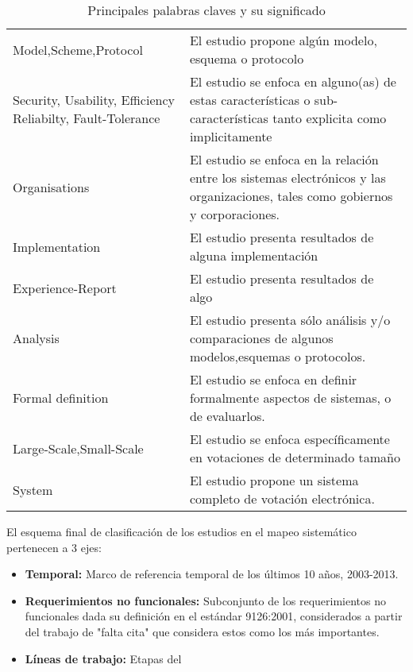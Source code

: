\bigskip
\begin{table}
\centering
\caption{Principales palabras claves y su significado} 
\begin{tabularx}{\textwidth}{p{4cm} X} 
\toprule[0.5pt]
	Model,Scheme,Protocol		&	El estudio propone algún modelo, esquema o protocolo	\\
	Security, Usability, Efficiency
	Reliabilty, Fault-Tolerance	&	El estudio se enfoca en alguno(as) de estas 
								características o sub-características tanto explicita 
								como implicitamente 	\\	
	Organisations				&	El estudio se enfoca en la relación entre los sistemas
								electrónicos y las organizaciones, tales como gobiernos
								y corporaciones.	\\
	Implementation			&	El estudio presenta resultados de alguna implementación \\
	Experience-Report			&	El estudio presenta resultados de algo \\
	Analysis					&	El estudio presenta sólo análisis y/o comparaciones de 
								algunos modelos,esquemas o protocolos. \\
	Formal definition			&	El estudio se enfoca en definir formalmente aspectos de
								sistemas, o de evaluarlos. \\
	Large-Scale,Small-Scale		&	El estudio se enfoca específicamente en votaciones de 
								determinado tamaño	\\
	System					&	El estudio propone un sistema completo de votación electrónica. \\
					
\bottomrule[0.5pt]
\end {tabularx}
\end{table}



El esquema final de clasificación de los estudios en el mapeo 
sistemático pertenecen a 3 ejes:

\begin{itemize}
	\item \textbf{Temporal:} Marco de referencia temporal de los últimos 10 años, 2003-2013.
	\item \textbf{Requerimientos no funcionales:} Subconjunto de los requerimientos no funcionales
	dada su definición en el estándar 9126:2001, considerados a partir del trabajo de "falta cita"
	que considera estos como los más importantes.
	\item \textbf{Líneas de trabajo:} Etapas del
\end{itemize}


